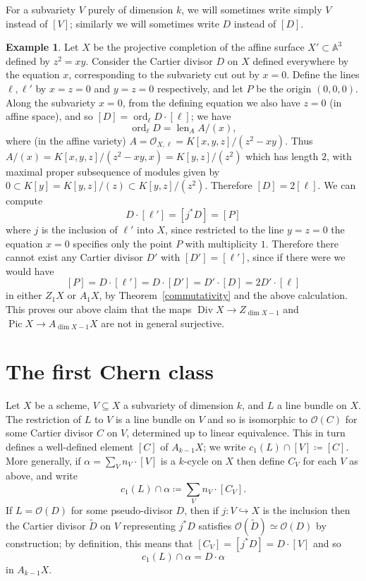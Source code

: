 \documentclass[leqno, openany]{memoir}
\theoremstyle{definition}
\newtheorem{exm}[thm]{Example}
\theoremstyle{remark}
\theoremstyle{plain}
\theoremstyle{definition}
\theoremstyle{remark}
\newcommand{\A}{\mathbb{A}}
\newcommand{\mc}[1]{\mathcal{#1}}
\DeclareMathOperator{\Pic}{Pic}
\DeclareMathOperator{\ord}{ord}
\DeclareMathOperator{\Div}{Div}
\begin{document}
For a subvariety $V$ purely of dimension $k$, we will sometimes write simply
$V$ instead of $[V]$; similarly we will sometimes write $D$ instead of $[D]$.

\begin{exm} Let $X$ be the projective completion of the affine surface $X'
    \subset \A^3$ defined by $z^2 = xy$. Consider the Cartier divisor $D$ on
    $X$ defined everywhere by the equation $x$, corresponding to the subvariety
    cut out by $x = 0$. Define the lines $\ell, \ell'$ by $x = z = 0$ and $y =
    z = 0$ respectively, and let $P$ be the origin $(0,0,0)$. Along the
    subvariety $x = 0$, from the defining equation we also have $z = 0$ (in
    affine space), and so $[D] = \ord_\ell D \cdot [\ell]$; we have \[
        \ord_\ell D = \operatorname{len}_A A/(x) , \] where (in the affine
        variety) $A = \mc{O}_{X,\ell} = K[x,y,z]/(z^2 - x y)$. Thus $A/(x) =
        K[x,y,z]/(z^2-xy,x) = K[y,z]/(z^2)$ which has length $2$, with maximal
        proper subsequence of modules given by $0 \subset K[y] = K[y,z]/(z)
        \subset K[y,z]/(z^2)$. Therefore $[D] = 2 [\ell]$.  We can compute \[ D
            \cdot [\ell'] = [j^* D] = [P] \] where $j$ is the inclusion of
            $\ell'$ into $X$, since restricted to the line $y = z = 0$ the
            equation $x=0$ specifies only the point $P$ with multiplicity $1$.
            Therefore there cannot exist any Cartier divisor $D'$ with $[D'] =
            [\ell']$, since if there were we would have \[ [P] = D \cdot
            [\ell'] = D \cdot [D'] = D' \cdot [D] = 2 D' \cdot [\ell] \] in
            either $Z_1 X$ or $A_1 X$, by Theorem~\ref{commutativity} and the
            above calculation. This proves our above claim that the maps $\Div
            X \to Z_{\dim X - 1}$ and $\Pic X \to A_{\dim X - 1} X$ are not in
            general surjective.  \end{exm}

\section{The first Chern class} Let $X$ be a scheme, $V \subseteq X$ a
subvariety of dimension $k$, and $L$ a line bundle on $X$. The restriction of
$L$ to $V$ is a line bundle on $V$ and so is isomorphic to $\mc{O}(C)$ for some
Cartier divisor $C$ on $V$, determined up to linear equivalence. This in turn
defines a well-defined element $[C]$ of $A_{k-1} X$; we write $c_1(L) \cap [V]
\coloneqq [C]$. More generally, if $\alpha = \sum_V n_V \cdot [V]$ is a
$k$-cycle on $X$ then define $C_V$ for each $V$ as above, and write \[ c_1(L)
    \cap \alpha \coloneqq \sum_V n_V \cdot [C_V] . \] If $L = \mc{O}(D)$ for
    some pseudo-divisor $D$, then if $j\colon V \hookrightarrow X$ is the
    inclusion then the Cartier divisor $\tilde D$ on $V$ representing $j^* D$
    satisfies $\mc{O}(\tilde D) \simeq \mc{O}(D)$ by construction; by
    definition, this means that $[C_V] = [j^* D] = D \cdot [V]$ and so \[
    c_1(L) \cap \alpha = D \cdot \alpha \] in $A_{k-1} X$.
\end{document}
